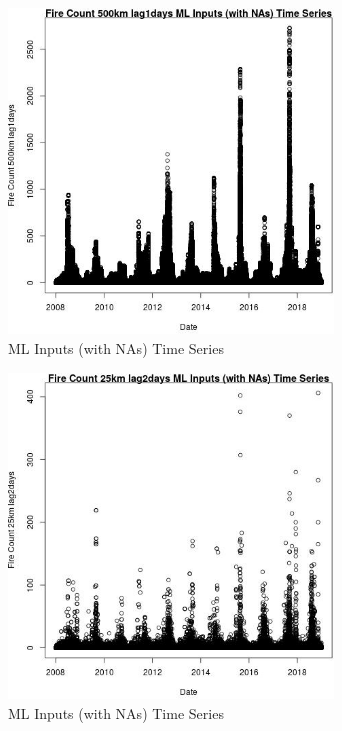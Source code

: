 \begin{figure} 
\centering  
\includegraphics[width=0.77\textwidth]{Code_Outputs/Report_ML_input_PM25_Step4_part_f_de_duplicated_aves_prioritize_24hr_obswNAs_Fire_Count_500km_lag1daysvDate.jpg} 
\caption{\label{fig:Report_ML_input_PM25_Step4_part_f_de_duplicated_aves_prioritize_24hr_obswNAsFire_Count_500km_lag1daysvDate}ML Inputs (with NAs) Time Series} 
\end{figure} 
 

\begin{figure} 
\centering  
\includegraphics[width=0.77\textwidth]{Code_Outputs/Report_ML_input_PM25_Step4_part_f_de_duplicated_aves_prioritize_24hr_obswNAs_Fire_Count_25km_lag2daysvDate.jpg} 
\caption{\label{fig:Report_ML_input_PM25_Step4_part_f_de_duplicated_aves_prioritize_24hr_obswNAsFire_Count_25km_lag2daysvDate}ML Inputs (with NAs) Time Series} 
\end{figure} 
 

